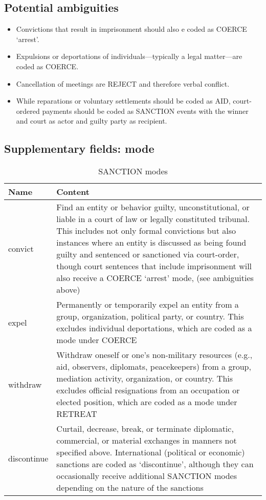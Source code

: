 \documentclass[11pt]{report}
\newcommand{\plcat}[1]{\textsf{#1}}
\begin{document}
\subsection{Potential ambiguities}

\begin{itemize}
\item Convictions that result in imprisonment should also e coded as \plcat{COERCE} `arrest'.
\item Expulsions or deportations of individuals---typically a legal matter---are coded as \plcat{COERCE}.
\item Cancellation of meetings are \plcat{REJECT} and therefore verbal conflict.
\item While reparations or voluntary settlements should be coded as \plcat{AID}, court-ordered payments should be coded as \plcat{SANCTION} events with the winner and court as actor and guilty party as recipient.
\end{itemize}

\subsection{Supplementary fields: mode}

\begin{table}[htp]
\caption{SANCTION modes}
\begin{center}
\begin{tabular}{|l|p{13cm}|}
\hline
Name & Content \\
\hline
convict &  Find an entity or behavior guilty, unconstitutional, or liable in a court of law or legally constituted tribunal. This includes not only formal convictions but also instances where an entity is discussed as being found guilty and sentenced or sanctioned via court-order, though court sentences that include imprisonment will also receive a \plcat{COERCE} `arrest' mode, (see ambiguities above)\\
expel & Permanently or temporarily expel an entity from a group, organization, political party, or country. This excludes individual deportations, which are coded as a mode under \plcat{COERCE}\\
withdraw & Withdraw oneself or one's non-military resources (e.g., aid, observers, diplomats, peacekeepers) from a group, mediation activity, organization, or country. This excludes official resignations from an occupation or elected position, which are coded as a mode under \plcat{RETREAT}\\
discontinue & Curtail, decrease, break, or terminate diplomatic, commercial, or material exchanges in manners not specified above. International (political or economic) sanctions are coded as `discontinue', although they can occasionally receive additional \plcat{SANCTION} modes depending on the nature of the sanctions \\
\hline
\end{tabular}
\end{center}
\label{tab:sanctionmode}
\end{table}%
\end{document}

